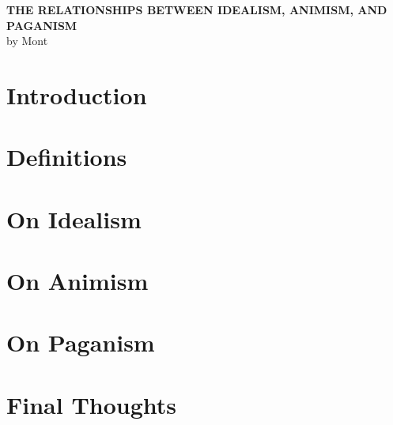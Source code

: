 \documentclass[12pt]{report}
\begin{document}
\begin{titlepage}
    \vspace*{\fill}
    \begin{center}
        {\Large\uppercase{\textbf{The Relationships Between Idealism, Animism, and Paganism}}} \\
        \vspace{1cm}
        {\Large by Mont} \\
    \end{center}
    \vspace*{\fill}
\end{titlepage}
\tableofcontents
\raggedright
\setlength{\parindent}{15pt}
\chapter{Introduction}

\chapter{Definitions}

\chapter{On Idealism}

\chapter{On Animism}

\chapter{On Paganism}

\chapter{Final Thoughts}

\printbibliography[heading=bibintoc]
\end{document}
